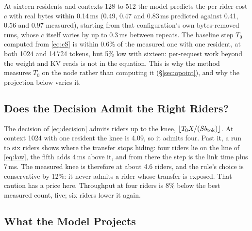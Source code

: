 At sixteen residents and contexts 128 to 512 the model predicts the per-rider
cost $c$ with real bytes within 0.14\,ms (0.49, 0.47 and 0.83\,ms predicted
against 0.41, 0.56 and 0.97 measured), starting from that configuration's own
bytes-removed runs, whose $c$ itself varies by up to 0.3\,ms between repeats.
The baseline step $T_0$ computed from \cref{eq:cS} is within 0.6\% of the
measured one with one resident, at both 1024 and 14\,724 tokens, but 5\% low
with sixteen: per-request work beyond the weight and KV reads is not in the
equation. This is why the method measures $T_0$ on the node rather than
computing it (\S\ref{sec:opoint}), and why the projection below varies it.

\subsection{Does the Decision Admit the Right Riders?}\label{sec:eval-knee}

The decision of \cref{eq:decision} admits riders up to the knee,
$\lfloor T_0X/(Sb_{\mathrm{tok}})\rfloor$. At context 1024 with one resident the
knee is 4.09, so it admits four. Past it, a run to six riders shows where
the transfer stops hiding: four riders lie on the line of \cref{eq:law}, the
fifth adds 4\,ms above it, and from there the step is the link time plus
7\,ms. The measured knee is therefore at about 4.6 riders, and the rule's
choice is conservative by 12\%: it never admits a rider whose transfer is
exposed. That caution has a price here. Throughput at four riders is 8\% below
the best measured count, five; six riders lower it again.

\subsection{What the Model Projects}\label{sec:eval-proj}

